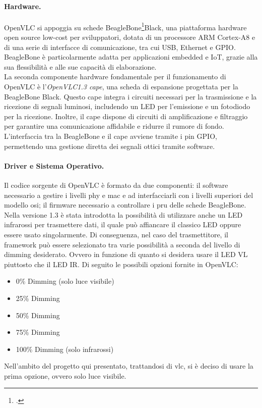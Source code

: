 \paragraph{Hardware.}
OpenVLC si appoggia su schede BeagleBone\footcite{site:beaglebone}Black, una piattaforma hardware open source low-cost per sviluppatori, dotata di un processore ARM Cortex-A8 e di una serie di interfacce di comunicazione, tra cui USB, Ethernet e GPIO. BeagleBone è particolarmente adatta per applicazioni embedded e IoT, grazie alla sua flessibilità e alle sue capacità di elaborazione.\\
La seconda componente hardware fondamentale per il funzionamento di OpenVLC è l'\textit{OpenVLC1.3 cape}, una scheda di espansione progettata per la BeagleBone Black. Questo cape integra i circuiti necessari per la trasmissione e la ricezione di segnali luminosi, includendo un LED per l'emissione e un fotodiodo per la ricezione. Inoltre, il cape dispone di circuiti di amplificazione e filtraggio per garantire una comunicazione affidabile e ridurre il rumore di fondo. L'interfaccia tra la BeagleBone e il cape avviene tramite i pin GPIO, permettendo una gestione diretta dei segnali ottici tramite software.

\paragraph{Driver e Sistema Operativo.}
Il codice sorgente di OpenVLC è formato da due componenti: il software necessario a gestire i livelli \gls{phy} e \gls{mac} e ad interfacciarli con i livelli superiori del modello \gls{osi}; il firmware necessario a controllare i \gls{pru} delle schede BeagleBone.\\
Nella versione 1.3 è stata introdotta la possibilità di utilizzare anche un LED infrarossi per trasmettere dati, il quale può affiancare il classico LED oppure essere usato singolarmente.
Di conseguenza, nel caso del trasmettitore, il framework può essere selezionato tra varie possibilità a seconda del livello di dimming desiderato. Ovvero in funzione di quanto si desidera usare il LED VL piuttosto che il LED IR.
Di seguito le possibili opzioni fornite in OpenVLC:
\begin{itemize}
    \item 0\% Dimming (solo luce visibile)
    \item 25\% Dimming
    \item 50\% Dimming
    \item 75\% Dimming
    \item 100\% Dimming (solo infrarossi)
\end{itemize}
Nell'ambito del progetto qui presentato, trattandosi di \gls{vlc}, si è deciso di usare la prima opzione, ovvero solo luce visibile.

